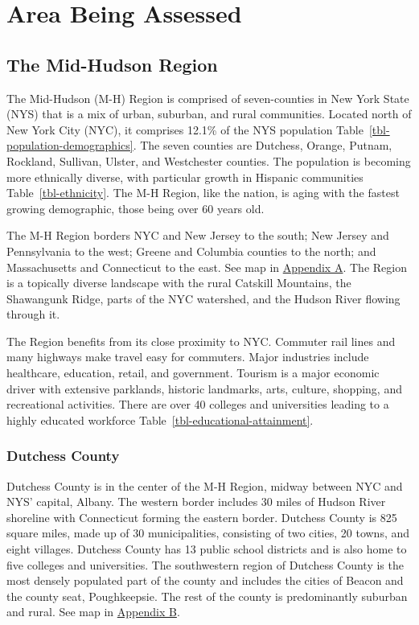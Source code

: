 \documentclass[
  english,
  letterpaper,
]{report}
\begin{document}

\chapter{Area Being Assessed}\label{area-being-assessed}

\section{The Mid-Hudson Region}\label{the-mid-hudson-region}

The Mid-Hudson (M-H) Region is comprised of seven-counties in New York
State (NYS) that is a mix of urban, suburban, and rural communities.
Located north of New York City (NYC), it comprises 12.1\% of the NYS
population Table~\ref{tbl-population-demographics}. The seven counties
are Dutchess, Orange, Putnam, Rockland, Sullivan, Ulster, and
Westchester counties. The population is becoming more ethnically
diverse, with particular growth in Hispanic communities
Table~\ref{tbl-ethnicity}. The M-H Region, like the nation, is aging
with the fastest growing demographic, those being over 60 years old.

The M-H Region borders NYC and New Jersey to the south; New Jersey and
Pennsylvania to the west; Greene and Columbia counties to the north; and
Massachusetts and Connecticut to the east. See map in
\hyperref[sec-appendix-a-map]{Appendix A}. The Region is a topically
diverse landscape with the rural Catskill Mountains, the Shawangunk
Ridge, parts of the NYC watershed, and the Hudson River flowing through
it.

The Region benefits from its close proximity to NYC. Commuter rail lines
and many highways make travel easy for commuters. Major industries
include healthcare, education, retail, and government. Tourism is a
major economic driver with extensive parklands, historic landmarks,
arts, culture, shopping, and recreational activities. There are over 40
colleges and universities leading to a highly educated workforce
Table~\ref{tbl-educational-attainment}.

\subsection{Dutchess County}\label{dutchess-county-1}

Dutchess County is in the center of the M-H Region, midway between NYC
and NYS' capital, Albany. The western border includes 30 miles of Hudson
River shoreline with Connecticut forming the eastern border. Dutchess
County is 825 square miles, made up of 30 municipalities, consisting of
two cities, 20 towns, and eight villages. Dutchess County has 13 public
school districts and is also home to five colleges and universities. The
southwestern region of Dutchess County is the most densely populated
part of the county and includes the cities of Beacon and the county
seat, Poughkeepsie. The rest of the county is predominantly suburban and
rural. See map in \hyperref[sec-appendix-b-map]{Appendix B}.
\end{document}

